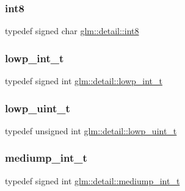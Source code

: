 \mbox{\label{namespaceglm_1_1detail_a04b526a8d7a9b455602a0afa78c531e0}} 
\subsubsection{\texorpdfstring{int8}{int8}}
{\footnotesize\ttfamily typedef signed char \hyperlink{namespaceglm_1_1detail_a04b526a8d7a9b455602a0afa78c531e0}{glm\+::detail\+::int8}}

\mbox{\label{namespaceglm_1_1detail_a030a8128e369fc1f9c7982dc68a78ba7}} 
\subsubsection{\texorpdfstring{lowp\+\_\+int\+\_\+t}{lowp\_int\_t}}
{\footnotesize\ttfamily typedef signed int \hyperlink{namespaceglm_1_1detail_a030a8128e369fc1f9c7982dc68a78ba7}{glm\+::detail\+::lowp\+\_\+int\+\_\+t}}

\mbox{\label{namespaceglm_1_1detail_ad59c4581ad8ce0c3ef6146edaa7e15dc}} 
\subsubsection{\texorpdfstring{lowp\+\_\+uint\+\_\+t}{lowp\_uint\_t}}
{\footnotesize\ttfamily typedef unsigned int \hyperlink{namespaceglm_1_1detail_ad59c4581ad8ce0c3ef6146edaa7e15dc}{glm\+::detail\+::lowp\+\_\+uint\+\_\+t}}

\mbox{\label{namespaceglm_1_1detail_aede0757f19204d1d44f716b3dd66d13c}} 
\subsubsection{\texorpdfstring{mediump\+\_\+int\+\_\+t}{mediump\_int\_t}}
{\footnotesize\ttfamily typedef signed int \hyperlink{namespaceglm_1_1detail_aede0757f19204d1d44f716b3dd66d13c}{glm\+::detail\+::mediump\+\_\+int\+\_\+t}}

